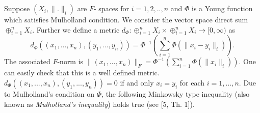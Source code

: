 \documentclass[pdflatex,sn-mathphys-num]{sn-jnl}%
\theoremstyle{thmstyleone}%
\theoremstyle{thmstyletwo}%
\theoremstyle{thmstylethree}%
\begin{document}
	Suppose $(X_i,\|.\|_i)$ are $F$- spaces for $i=1,2,..,n$ and $\Phi$ is a Young function which satisfies Mulholland condition. We consider the vector space  direct sum $\oplus_{i=1}^nX_i$. Further we define a metric $d_\Phi:\oplus_{i=1}^nX_i\times\oplus_{i=1}^nX_i\to [0,\infty)$ as $$d_\Phi\left((x_1,...,x_n),(y_1,...,y_n)\right)=\Phi^{-1}\left(\sum_{i=1}^n\Phi\left(\|x_i-y_i\|_i\right)\right).$$
	The associated $F$-norm is $\|(x_1,...,x_n)\|_F=\Phi^{-1}\left(\sum_{i=1}^n\Phi(\|x_i\|_i)\right)$.
	One can easily check that this is a well defined metric. $d_\Phi\left((x_1,...,x_n),(y_1,...,y_n)\right)=0$ if and only $x_i=y_i$ for each $i=1,...,n$. Due to Mulholland's condition on $\Phi$, the following Minkowsky type inequality (also known as \emph{Mulholland's inequality}) holds true (see \cite{Mulholland}[5, Th. 1]). 
	
\end{document}
